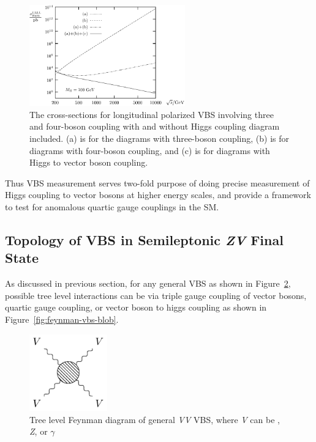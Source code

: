 \begin{figure}[!ht]
  \centering
  \includegraphics[width=0.6\textwidth]{figures/unitarity.pdf}
  \caption[The cross-sections for longitudinal polarized \gls{VBS} involving three
    and four-boson coupling with and without Higgs coupling included.]%
  {The cross-sections for longitudinal polarized \gls{VBS} involving three
    and four-boson coupling with and without Higgs coupling diagram included.
    (a) is for the diagrams with three-boson coupling,
    (b) is for diagrams with four-boson coupling, and (c) is for diagrams
    with Higgs to vector boson coupling.~\cite{Denner1997}}%
  \label{fig:vbs-at-high-energies}
\end{figure}


Thus \gls{VBS} measurement serves two-fold purpose of
doing precise measurement of Higgs coupling to vector bosons
at higher energy scales,
and provide a framework to test for anomalous quartic gauge
couplings in the \gls{SM}.


\subsection{
  Topology of VBS in Semileptonic \textit{ZV} Final State
}

As discussed in previous section, for any general \gls{VBS} as shown in
Figure~\ref{fig:feynman-vbs-general}, possible tree level
interactions can be via triple gauge coupling of vector bosons,
quartic gauge coupling, or vector boson to higgs coupling as
shown in Figure~\ref{fig:feynman-vbs-blob}.

\begin{figure}[!ht]
  \centering
  \includegraphics[width=0.3\textwidth]{figures/feyn_vbs_general.pdf}
  \caption[Tree level Feynman diagram of general \textit{VV} \gls{VBS}]%
  {Tree level Feynman diagram of general \textit{VV} \gls{VBS},
    where \textit{V} can be \Wplusminus{}, \textit{Z}, or \( \gamma \)}%
  \label{fig:feynman-vbs-general}
\end{figure}

